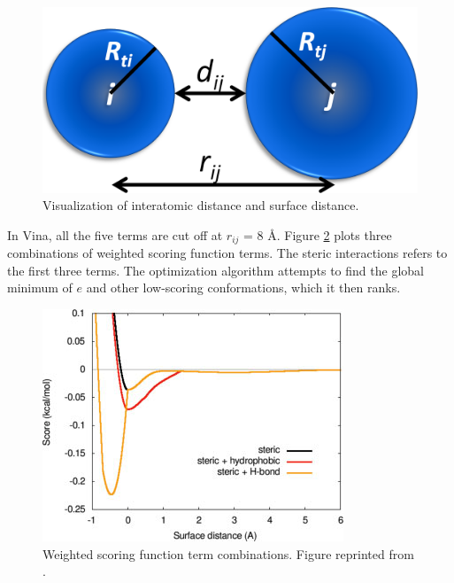 \begin{figure}
\centering
\includegraphics[width=\textwidth]{VirtualScreening/Figures/Distance.png}
\caption{Visualization of interatomic distance and surface distance.}
\label{fig:DockingDistance}
\end{figure}

In Vina, all the five terms are cut off at $r_{ij}$ = 8 \AA. Figure \ref{fig:ScoringFunction} \citep{595-2010} plots three combinations of weighted scoring function terms. The steric interactions refers to the first three terms. The optimization algorithm attempts to find the global minimum of $e$ and other low-scoring conformations, which it then ranks.

\begin{figure}[t]
\centering
\includegraphics[width=\textwidth]{VirtualScreening/Figures/ScoringFunction.png}
\caption{Weighted scoring function term combinations. Figure reprinted from \citep{595-2010}.}
\label{fig:ScoringFunction}
\end{figure}

